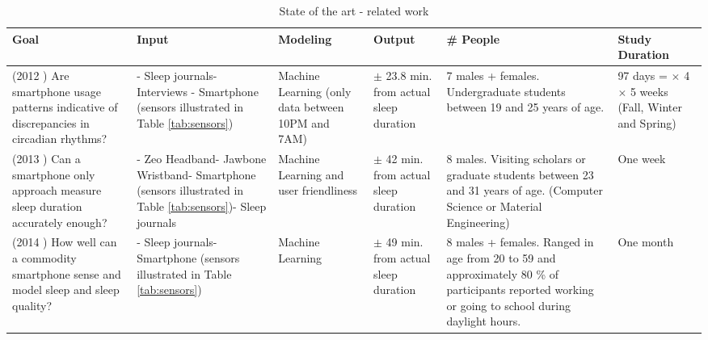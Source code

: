 \documentclass[12pt]{article} %
\begin{document}
\begin{table}[H]
\center
\begin{footnotesize}
	\begin{tabular}{|p{2.2cm} |p{2.5cm} |p{2cm} |p{2.1cm} |p{2.8cm} |p{1.8cm} |}
	\hline
	\textbf{Goal} & \textbf{Input} & \textbf{Modeling} & \textbf{Output} & \textbf{\# People} & \textbf{Study Duration}\\
	\hline
	\hline
	(2012 \cite{beWell}) Are smartphone usage patterns indicative of discrepancies in circadian rhythms? & - Sleep journals\newline - Interviews \newline - Smartphone \newline(sensors illustrated in Table \ref{tab:sensors})  & Machine Learning (only data between 10PM and 7AM) & $\pm$ 23.8 min. from actual \newline sleep \newline duration & 7 males + \newline 2 females. \newline Undergraduate students between 19 and 25 years of age. & 97 days = \newline 5 $\times$ 4 $\times$ 5 weeks (Fall, Winter and Spring)\\
	\hline
	(2013 \cite{compare}) Can a smartphone only approach measure sleep duration accurately enough? & - Zeo Headband\newline - Jawbone \newline Wristband\newline - Smartphone \newline(sensors illustrated in Table \ref{tab:sensors})\newline - Sleep journals & Machine Learning and user friendliness & $\pm$ 42 min. from actual \newline sleep \newline duration & 8 males. \newline Visiting scholars or graduate students between 23 and 31 years of age. (Computer Science or Material Engineering) & One week \\
	\hline
	(2014 \cite{toss}) How well can a commodity smartphone sense and model sleep and sleep quality? & - Sleep journals\newline - Smartphone \newline(sensors illustrated in Table \ref{tab:sensors}) & Machine Learning & $\pm$ 49 min. from  actual \newline sleep \newline duration & 8 males + \newline 19 females. \newline Ranged in age from 20 to 59 and approximately 80 \% of participants reported working or going to school during daylight hours. & One month \\
	\hline 
	\end{tabular}
	\caption{State of the art - related work}
	\label{tab:tableApproach}
\end{footnotesize}
\end{table}
\end{document}
